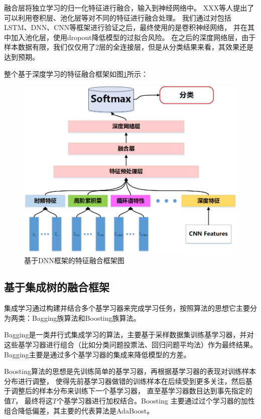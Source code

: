 融合层将独立学习的归一化特征进行融合，输入到神经网络中。
XXX等人提出了可以利用卷积层、池化层等对不同的特征进行融合处理。
我们通过对包括LSTM、DNN、CNN等框架进行验证之后，最终使用的是卷积神经网络，
并在其中加入池化层，使用dropout降低模型的过拟合风险。
在之后的深度网络层，由于样本数据有限，我们仅仅用了2层的全连接层，但是从分类结果来看，其效果还是达到预期。\par


整个基于深度学习的特征融合框架如图\ref{sec:fig_4_3}所示：
\begin{figure}[!h]
	\centering
	\includegraphics[scale=0.55]{figures/chapter_4/fig_4_3}
	\caption{基于DNN框架的特征融合框架图}\label{sec:fig_4_3}
\end{figure}


\subsection{基于集成树的融合框架}
集成学习通过构建并结合多个基学习器来完成学习任务，按照算法的思想它主要分为两类：Bagging族算法和Boosting族算法。\par

Bagging\cite{breiman1996bagging}是一类井行式集成学习的算法，主要基于采样数据集训练基学习器，并对这些基学习器进行组合（比如分类问题投票法、回归问题平均法）作为最终结果。Bagging主要是通过多个基学习器的集成来降低模型的方差。

Boosting算法\cite{freund1999short}的思想是先训练简单的基学习器，再根据基学习器的表现对训练样本分布进行调整，
使得先前基学习器做错的训练样本在后续受到更多关注，然后基于调整后的样本分布来训练下一个基学习器，
直至基学习器数目达到事先指定的值$T$， 最终将这$T$个基学习器进行加权结合。Boosting 主要通过过个学习器的加性组合降低偏差，其主要的代表算法是AdaBoost\cite{freund1996experiments}。\par


